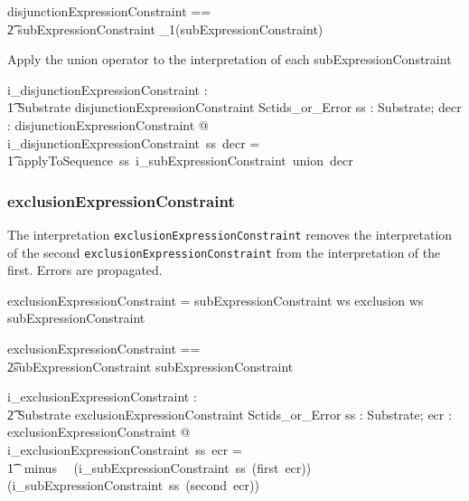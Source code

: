 \documentclass{article}
\def\spec#1{{\tt #1}}
\def\bnf#1{{\scriptsize {{#1}} }}
\begin{document}
\begin{zed}
disjunctionExpressionConstraint == \\
\t2 subExpressionConstraint \cross \seq_1(subExpressionConstraint)
\end{zed}

Apply the union operator to the interpretation of each  subExpressionConstraint

\begin{gendef}
    i\_disjunctionExpressionConstraint : \\
\t1 Substrate \fun disjunctionExpressionConstraint \fun Sctids\_or\_Error
\where
   \forall ss : Substrate;  decr : disjunctionExpressionConstraint @ \\
i\_disjunctionExpressionConstraint~ss~decr = \\
\t1 applyToSequence~ss~i\_subExpressionConstraint~union~decr
\end{gendef}




\subsubsection{exclusionExpressionConstraint}
The interpretation \spec{exclusionExpressionConstraint} removes the interpretation of the second \spec{exclusionExpressionConstraint} from
the interpretation of the first.  Errors are propagated.

\begin{framed}
\noindent
\bnf{exclusionExpressionConstraint = subExpressionConstraint ws exclusion ws subExpressionConstraint}
\end{framed}

\begin{zed}
exclusionExpressionConstraint == \\ 
\t2subExpressionConstraint \cross subExpressionConstraint
\end{zed}

\begin{gendef}
    i\_exclusionExpressionConstraint : \\
\t2 Substrate \fun exclusionExpressionConstraint \fun Sctids\_or\_Error
\where
   \forall ss : Substrate; ecr : exclusionExpressionConstraint @ \\
i\_exclusionExpressionConstraint~ss~ecr = \\
\t1~ minus~~ (i\_subExpressionConstraint~ss~(first~ecr)) (i\_subExpressionConstraint~ss~(second~ecr))
\end{gendef}
\end{document}

